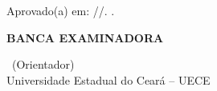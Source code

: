 \begin{folhadeaprovacao}
  \centering\bfseries
  \MakeUppercase{\imprimirautor}
  \par\vspace*{\fill}
  \MakeUppercase{\imprimirtitulo}
  \par\vspace*{\fill}
  \normalfont
  \begin{SingleSpacing}
  \hspace{8cm}\begin{minipage}{\dimexpr\textwidth-8cm}
    \imprimirpreambulo
  \end{minipage}
  \end{SingleSpacing}
  \par\vspace{1cm}
  \raggedright
  Aprovado(a) em:
  \ifx\dataaprovacao\empty
    \underline{\hspace{1cm}}/\underline{\hspace{1cm}}/\underline{\hspace{1.6cm}}.
  \else
    \dataaprovacao.
  \fi
  \par\vspace{1cm}
  \centering\textbf{BANCA EXAMINADORA}
  \par\vspace{1cm}
  \begin{SingleSpacing}
  \imprimirorientador\ (Orientador) \\
  Universidade Estadual do Ceará -- UECE
  \ifx\membrobancaum\empty\else\par\vspace{1cm}\membrobancaum\fi
  \ifx\membrobancadois\empty\else\par\vspace{1cm}\membrobancadois\fi
  \end{SingleSpacing}
  \vspace*{\fill}
\end{folhadeaprovacao}
